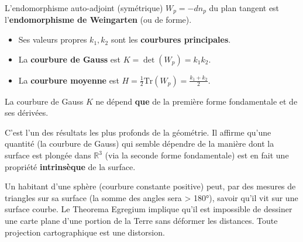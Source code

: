 \begin{definition}
    L'endomorphisme auto-adjoint (symétrique) $W_p = -dn_p$ du plan tangent est l'\textbf{endomorphisme de Weingarten} (ou de forme).
    \begin{itemize}
        \item Ses valeurs propres $k_1, k_2$ sont les \textbf{courbures principales}.
        \item La \textbf{courbure de Gauss} est $K = \det(W_p) = k_1 k_2$.
        \item La \textbf{courbure moyenne} est $H = \frac{1}{2} \mathrm{Tr}(W_p) = \frac{k_1+k_2}{2}$.
    \end{itemize}
\end{definition}

\begin{theorem}
    La courbure de Gauss $K$ ne dépend \textbf{que} de la première forme fondamentale et de ses dérivées.
\end{theorem}
\begin{remark}
    C'est l'un des résultats les plus profonds de la géométrie. Il affirme qu'une quantité (la courbure de Gauss) qui semble dépendre de la manière dont la surface est plongée dans $\mathbb{R}^3$ (via la seconde forme fondamentale) est en fait une propriété \textbf{intrinsèque} de la surface.
\end{remark}

\begin{application}[Cartographie]
    Un habitant d'une sphère (courbure constante positive) peut, par des mesures de triangles sur sa surface (la somme des angles sera > 180°), savoir qu'il vit sur une surface courbe. Le Theorema Egregium implique qu'il est impossible de dessiner une carte plane d'une portion de la Terre sans déformer les distances. Toute projection cartographique est une distorsion.
\end{application}
